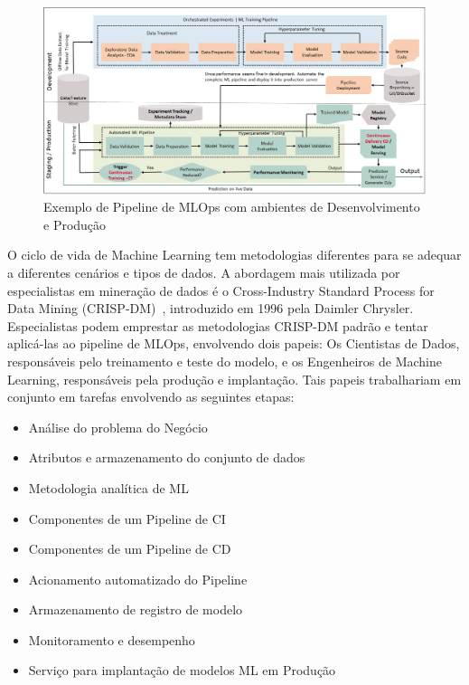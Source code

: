 \documentclass[portugues]{ic-tese}
\begin{document}
\begin{figure}[H]
\centering
\includegraphics[scale=0.33]{images/mlops-pipeline-example.png}
\caption {Exemplo de Pipeline de MLOps com ambientes de Desenvolvimento e Produção}
\label{fig:MLOpsPipeline}
\end{figure}

O ciclo de vida de Machine Learning tem metodologias diferentes para se adequar a diferentes cenários e tipos de dados. A abordagem mais utilizada por especialistas em mineração de dados é o Cross-Industry Standard Process for Data Mining (CRISP-DM)~\citep{Shearer_2000}, introduzido em 1996 pela Daimler Chrysler. Especialistas podem emprestar as metodologias CRISP-DM padrão e tentar aplicá-las ao pipeline de MLOps, envolvendo dois papeis: Os Cientistas de Dados, responsáveis pelo treinamento e teste do modelo, e os Engenheiros de Machine Learning, responsáveis pela produção e implantação. Tais papeis trabalhariam em conjunto em tarefas envolvendo as seguintes etapas:

\begin{itemize}
    \item Análise do problema do Negócio
    \item Atributos e armazenamento do conjunto de dados
    \item Metodologia analítica de ML
    \item Componentes de um Pipeline de CI
    \item Componentes de um Pipeline de CD
    \item Acionamento automatizado do Pipeline
    \item Armazenamento de registro de modelo
    \item Monitoramento e desempenho
    \item Serviço para implantação de modelos ML em Produção
\end{itemize}
\end{document}
